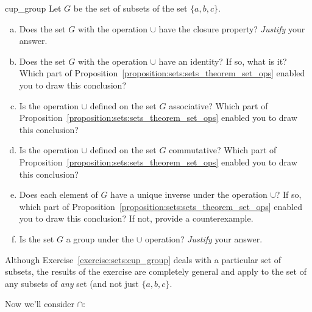 \begin{exercise}{cup_group}
Let $G$ be the set of subsets of the set $\{a,b,c\}$.
\begin{enumerate}[(a)]
\item
Does the set $G$  with the operation $\cup$ have the closure property? \emph{Justify} your answer.
\item
Does the set $G$  with the operation $\cup$ have an identity? If so, what is it? Which part of  Proposition~\ref{proposition:sets:sets_theorem_set_ops} enabled you to draw this conclusion?
\item
Is the operation $\cup$ defined on the set $G$ associative? Which part of  Proposition~\ref{proposition:sets:sets_theorem_set_ops} enabled you to draw this conclusion?
\item
Is the operation $\cup$ defined on the set $G$ commutative? Which part of  Proposition~\ref{proposition:sets:sets_theorem_set_ops} enabled you to draw this conclusion?
\item
Does each element of $G$ have a unique inverse under the operation $\cup$? If so, which part of  Proposition~\ref{proposition:sets:sets_theorem_set_ops} enabled you to draw this conclusion? If not, provide a counterexample.
\item
Is the set $G$ a group under the $\cup$ operation?  \emph{Justify} your answer.
\end{enumerate}
\end{exercise} 

Although Exercise~\ref{exercise:sets:cup_group} deals with a particular set of subsets,  the results of the  exercise are completely general and apply to the set of any subsets of \emph{any} set (and not just $\{a,b,c\}$.  
 
Now we'll consider $\cap$:

